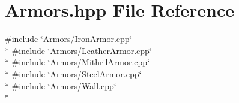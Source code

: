 \section{Armors.\-hpp File Reference}
\label{_armors_8hpp}
{\ttfamily \#include \char`\"{}Armors/\-Iron\-Armor.\-cpp\char`\"{}}\\*
{\ttfamily \#include \char`\"{}Armors/\-Leather\-Armor.\-cpp\char`\"{}}\\*
{\ttfamily \#include \char`\"{}Armors/\-Mithril\-Armor.\-cpp\char`\"{}}\\*
{\ttfamily \#include \char`\"{}Armors/\-Steel\-Armor.\-cpp\char`\"{}}\\*
{\ttfamily \#include \char`\"{}Armors/\-Wall.\-cpp\char`\"{}}\\*
